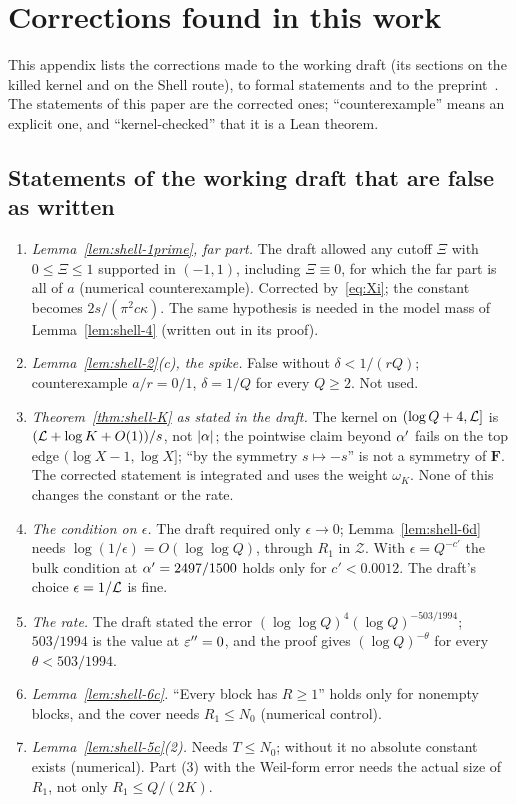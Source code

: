 \section{Corrections found in this work}\label{app:corr}

This appendix lists the corrections made to the working draft (its sections on the killed kernel and on the Shell route), to formal statements and
to the preprint~\cite{DSouza}. The statements of this paper are the corrected ones; ``counterexample'' means an explicit one, and ``kernel-checked''
that it is a Lean theorem.

\subsection{Statements of the working draft that are false as written}
\begin{enumerate}
\item \emph{Lemma~\ref{lem:shell-1prime}, far part.} The draft allowed any cutoff $\Xi$ with $0\le\Xi\le1$ supported in $(-1,1)$, including $\Xi\equiv0$, for
which the far part is all of $a$ (numerical counterexample). Corrected by~\eqref{eq:Xi}; the constant becomes $2s/(\pi^2c\kappa)$. The same
hypothesis is needed in the model mass of Lemma~\ref{lem:shell-4} (written out in its proof).
\item \emph{Lemma~\ref{lem:shell-2}(c), the spike.} False without $\delta<1/(rQ)$; counterexample $a/r=0/1$, $\delta=1/Q$ for every $Q\ge2$. Not used.
\item \emph{Theorem~\ref{thm:shell-K} as stated in the draft.} The kernel on $(\log Q+4,\mathcal L]$ is $(\mathcal L+\log K+O(1))/s$, not $\lvert \alpha\rvert$; the pointwise claim beyond
$\alpha'$ fails on the top edge $(\log X-1,\log X]$; ``by the symmetry $s\mapsto-s$'' is not a symmetry of $\mathbf F$. The corrected statement is integrated and uses
the weight $\omega_K$. None of this changes the constant or the rate.
\item \emph{The condition on $\epsilon$.} The draft required only $\epsilon\to0$; Lemma~\ref{lem:shell-6d} needs $\log(1/\epsilon)=O(\log\log Q)$, through $R_1$ in
$\mathcal Z$. With $\epsilon=Q^{-c'}$ the bulk condition at $\alpha'=2497/1500$ holds only for $c'<0.0012$. The draft's choice $\epsilon=1/\mathcal L$ is fine.
\item \emph{The rate.} The draft stated the error $(\log\log Q)^4(\log Q)^{-503/1994}$; $503/1994$ is the value at $\varepsilon''=0$, and the proof gives
$(\log Q)^{-\theta}$ for every $\theta<503/1994$.
\item \emph{Lemma~\ref{lem:shell-6c}.} ``Every block has $R\ge1$'' holds only for nonempty blocks, and the cover needs $R_1\le N_0$ (numerical control).
\item \emph{Lemma~\ref{lem:shell-5c}(2).} Needs $T\le N_0$; without it no absolute constant exists (numerical). Part (3) with the Weil-form error needs the
actual size of $R_1$, not only $R_1\le Q/(2K)$.
\end{enumerate}
